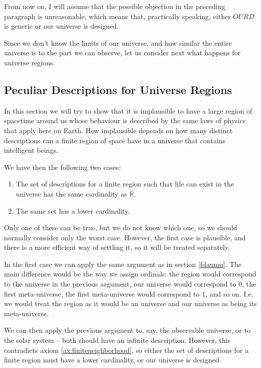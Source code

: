 \documentclass[a4paper
]{article}
\def\reale{\mathbb{R}}
\def\our_description{OURD}
\begin{document}
From now on, I will assume that the possible objection in the preceding
paragraph is unreasonable, which means that, practically speaking,
either $\our_description$ is generic or our universe is designed.

Since we don't know the limits of our universe, and how similar
the entire universe is to the part we can observe, let us consider next
what happens for universe regions.

\subsection{Peculiar Descriptions for Universe Regions}
\label{sec:peculiarregions}

In this section we will try to show that it is implausible to have a large
region of spacetime around us whose behaviour is described by the same laws
of physics that apply here on Earth.
How implausible depends on how many
distinct descriptions can a finite region of space have in a universe
that contains intelligent beings.

We have then the following two cases:
\begin{enumerate}
  \item The set of descriptions for a finite region such that life
      can exist in the universe has the same cardinality as $\reale$.
  \item The same set has a lower cardinality.
\end{enumerate}
Only one of these can be true, but we do not know which one, so we should
normally consider only the worst case. However, the first case is plausible,
and there is a more efficient way of settling it, so it will be treated
separately.

In the first case we can apply the same argument
as in section \ref{fdaumu}. The main difference would be the way we assign
ordinals: the region would correspond to the universe in the previous argument,
our universe would correspond to $0$, the first meta-universe,
the first meta-universe would correspond
to $1$, and so on. I.e. we would treat the region as it would be an universe
and our universe as being its meta-universe.

We can then apply the previous argument to, say, the observable universe, or
to the solar system -- both should have an infinite description.
However, this contradicts axiom \ref{ax:finiteneighborhood}, so either the
set of descriptions for a finite region must have a lower cardinality, or our
universe is designed.
\end{document}
